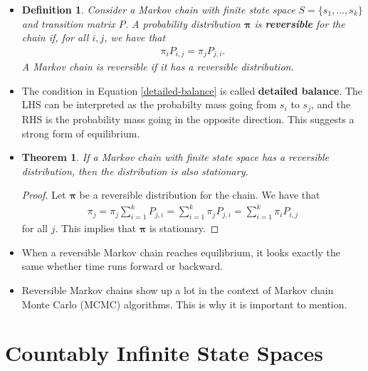 \documentclass[10pt]{article}
\newtheorem{theorem}[lemma]{Theorem}
\newtheorem{definition}[lemma]{Definition}
\newcommand{\ves}[1]{\boldsymbol{#1}}
\begin{document}
\begin{itemize}
  \item \begin{definition}
    Consider a Markov chain with finite state space $S = \{ s_1, \dotsc, s_k \}$ and transition matrix $P$. A probability distribution $\ves{\pi}$ is {\bf reversible} for the chain if, for all $i,j$, we have that
    \begin{align}
        \pi_i P_{i,j} = \pi_j P_{j,i}. \label{detailed-balance}
    \end{align}
    A Markov chain is reversible if it has a reversible distribution.
  \end{definition}

  \item The condition in Equation \eqref{detailed-balance} is called {\bf detailed balance}. The LHS can be interpreted as the probabilty mass going from $s_i$ to $s_j$, and the RHS is the probability mass going in the opposite direction. This suggests a strong form of equilibrium.
  
  \item \begin{theorem} \label{theorem:reversible-distribution-is-stationary}
    If a Markov chain with finite state space has a reversible distribution, then the distribution is also stationary. 
  \end{theorem}

  \begin{proof}
    Let $\ves{\pi}$ be a reversible distribution for the chain. We have that
    \begin{align*}
        \pi_j = \pi_j \sum_{i=1}^k P_{j,i} = \sum_{i=1}^k \pi_j P_{j,i} = \sum_{i=1}^k \pi_i P_{i,j}
    \end{align*}
    for all $j$. This implies that $\ves{\pi}$ is stationary. 
  \end{proof}

  \item When a reversible Markov chain reaches equilibrium, it looks exactly the same whether time runs forward or backward.
  
  \item Reversible Markov chains show up a lot in the context of Markov chain Monte Carlo (MCMC) algorithms. This is why it is important to mention.
\end{itemize}

\section{Countably Infinite State Spaces}
\end{document}
